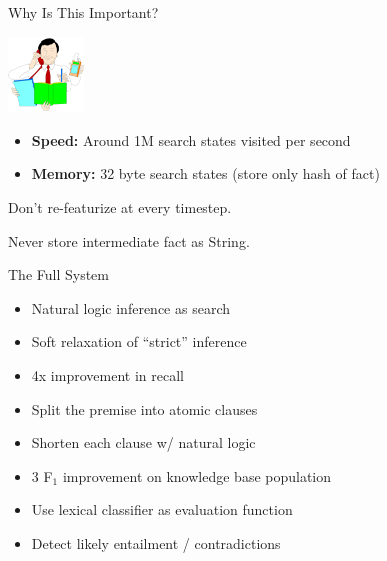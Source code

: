\def\title{Why Is This Important?}
\begin{frame}{\title}
\begin{center}
\includegraphics[height=2cm]{../img/efficient.png}
\end{center}

\begin{itemize}
\item \textbf{Speed:} Around 1M search states visited per second
\item \textbf{Memory:} 32 byte search states (store only hash of fact)
\end{itemize}
\vspace{2ex}
\pause

 Don't re-featurize at every timestep.
\vspace{2ex}
\pause

 Never store intermediate fact as String.
\end{frame}


\def\title{The Full System}
\begin{frame}{\title}

\begin{itemize}
\item Natural logic inference as search
\item Soft relaxation of ``strict'' inference
\item 4x improvement in recall
\end{itemize}
\vspace{1ex}
\pause

\begin{itemize}
\item Split the premise into atomic clauses
\item Shorten each clause w/ natural logic
\item 3 F$_1$ improvement on knowledge base population
\end{itemize}
\vspace{1ex}
\pause

\begin{itemize}
\item Use lexical classifier as evaluation function
\item Detect likely entailment / contradictions
\end{itemize}
\end{frame}

